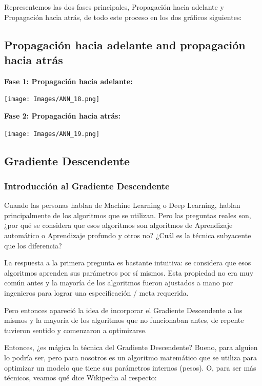 \documentclass[
]{book}
\begin{document}
Representemos las dos fases principales, Propagación hacia adelante y Propagación hacia atrás, de todo este proceso en los dos gráficos siguientes:

\hypertarget{propagaciuxf3n-hacia-adelante-and-propagaciuxf3n-hacia-atruxe1s}{%
\subsection{Propagación hacia adelante and propagación hacia atrás}\label{propagaciuxf3n-hacia-adelante-and-propagaciuxf3n-hacia-atruxe1s}}

\textbf{Fase 1: Propagación hacia adelante:}

\texttt{[image: Images/ANN\_18.png]}

\textbf{Fase 2: Propagación hacia atrás:}

\texttt{[image: Images/ANN\_19.png]}

\hypertarget{gradiente-descendente}{%
\subsection{Gradiente Descendente}\label{gradiente-descendente}}

\hypertarget{introducciuxf3n-al-gradiente-descendente}{%
\subsubsection{Introducción al Gradiente Descendente}\label{introducciuxf3n-al-gradiente-descendente}}

Cuando las personas hablan de Machine Learning o Deep Learning, hablan principalmente de los algoritmos que se utilizan. Pero las preguntas reales son, ¿por qué se considera que esos algoritmos son algoritmos de Aprendizaje automático o Aprendizaje profundo y otros no? ¿Cuál es la técnica subyacente que los diferencia?

La respuesta a la primera pregunta es bastante intuitiva: se considera que esos algoritmos aprenden sus parámetros por sí mismos. Esta propiedad no era muy común antes y la mayoría de los algoritmos fueron ajustados a mano por ingenieros para lograr una especificación / meta requerida.

Pero entonces apareció la idea de incorporar el Gradiente Descendente a los mismos y la mayoría de los algoritmos que no funcionaban antes, de repente tuvieron sentido y comenzaron a optimizarse.

Entonces, ¿es mágica la técnica del Gradiente Descendente? Bueno, para alguien lo podría ser, pero para nosotros es un algoritmo matemático que se utiliza para optimizar un modelo que tiene sus parámetros internos (pesos). O, para ser más técnicos, veamos qué dice Wikipedia al respecto:
\end{document}
